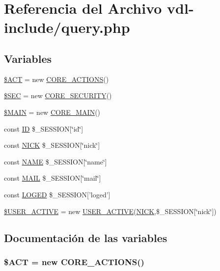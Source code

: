 \hypertarget{query_8php}{\section{Referencia del Archivo vdl-\/include/query.php}
\label{query_8php}
}
\subsection*{Variables}
\begin{DoxyCompactItemize}
\item 
\hyperlink{query_8php_acccd6054a25e75994d89dd0d42dab8fc}{\$\-A\-C\-T} = new \hyperlink{classCORE__ACTIONS}{C\-O\-R\-E\-\_\-\-A\-C\-T\-I\-O\-N\-S}()
\item 
\hyperlink{query_8php_a68aa4f40df62985576ba2fc584690b9f}{\$\-S\-E\-C} = new \hyperlink{classCORE__SECURITY}{C\-O\-R\-E\-\_\-\-S\-E\-C\-U\-R\-I\-T\-Y}()
\item 
\hyperlink{query_8php_aa3efd4a61925b50d9d066bd2b42dcd3d}{\$\-M\-A\-I\-N} = new \hyperlink{classCORE__MAIN}{C\-O\-R\-E\-\_\-\-M\-A\-I\-N}()
\item 
const \hyperlink{query_8php_a0242c89b204631bde9edc65a9a731f47}{I\-D} \$\-\_\-\-S\-E\-S\-S\-I\-O\-N\mbox{[}\char`\"{}id\char`\"{}\mbox{]}
\item 
const \hyperlink{query_8php_abdd850ab3ab0275cf56392a54ffb3af9}{N\-I\-C\-K} \$\-\_\-\-S\-E\-S\-S\-I\-O\-N\mbox{[}\char`\"{}nick\char`\"{}\mbox{]}
\item 
const \hyperlink{query_8php_a244352f035b82b20b0efa506167fd862}{N\-A\-M\-E} \$\-\_\-\-S\-E\-S\-S\-I\-O\-N\mbox{[}\char`\"{}name\char`\"{}\mbox{]}
\item 
const \hyperlink{query_8php_a347ad8be6c67745f0c0fac9638a0eec2}{M\-A\-I\-L} \$\-\_\-\-S\-E\-S\-S\-I\-O\-N\mbox{[}\char`\"{}mail\char`\"{}\mbox{]}
\item 
const \hyperlink{query_8php_a2c67e1e38c1ba2b45b1fb652313c6d22}{L\-O\-G\-E\-D} \$\-\_\-\-S\-E\-S\-S\-I\-O\-N\mbox{[}'loged'\mbox{]}
\item 
\hyperlink{query_8php_ab0978072b4a0a336b6ca785fa4553c59}{\$\-U\-S\-E\-R\-\_\-\-A\-C\-T\-I\-V\-E} = new \hyperlink{classUSER__ACTIVE}{U\-S\-E\-R\-\_\-\-A\-C\-T\-I\-V\-E}(\hyperlink{set__update_8php_abdd850ab3ab0275cf56392a54ffb3af9}{N\-I\-C\-K},\$\-\_\-\-S\-E\-S\-S\-I\-O\-N\mbox{[}\char`\"{}nick\char`\"{}\mbox{]})
\end{DoxyCompactItemize}


\subsection{Documentación de las variables}
\hypertarget{query_8php_acccd6054a25e75994d89dd0d42dab8fc}{
\subsubsection[{\$\-A\-C\-T}]{\setlength{\rightskip}{0pt plus 5cm}\$A\-C\-T = new {\bf C\-O\-R\-E\-\_\-\-A\-C\-T\-I\-O\-N\-S}()}}\label{query_8php_acccd6054a25e75994d89dd0d42dab8fc}


